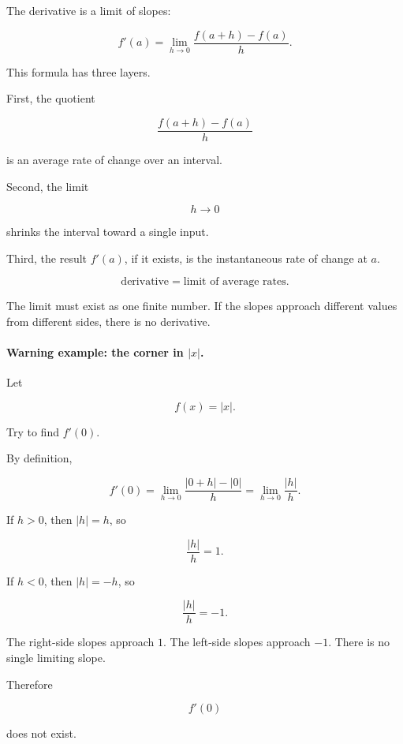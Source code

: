 The derivative is a limit of slopes:

\[
f'(a)
=
\lim_{h\to0}
\frac{f(a+h)-f(a)}{h}.
\]

This formula has three layers.

First, the quotient

\[
\frac{f(a+h)-f(a)}{h}
\]

is an average rate of change over an interval.

Second, the limit

\[
h\to0
\]

shrinks the interval toward a single input.

Third, the result \(f'(a)\), if it exists, is the instantaneous rate of change at \(a\).

\[
\boxed{
\text{derivative}
=
\text{limit of average rates}.
}
\]

The limit must exist as one finite number.  If the slopes approach different values from different sides, there is no derivative.

\paragraph{Warning example: the corner in \(|x|\).}
Let

\[
f(x)=|x|.
\]

Try to find \(f'(0)\).

By definition,

\[
f'(0)
=
\lim_{h\to0}\frac{|0+h|-|0|}{h}
=
\lim_{h\to0}\frac{|h|}{h}.
\]

If \(h>0\), then \(|h|=h\), so

\[
\frac{|h|}{h}=1.
\]

If \(h<0\), then \(|h|=-h\), so

\[
\frac{|h|}{h}=-1.
\]

The right-side slopes approach \(1\).  The left-side slopes approach \(-1\).  There is no single limiting slope.

Therefore

\[
f'(0)
\]

does not exist.

